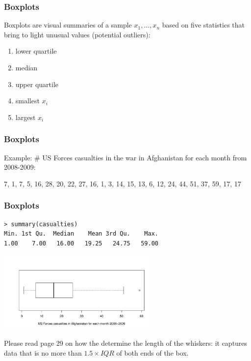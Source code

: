 \documentclass[handout]{beamer}
\newcommand{\blue}[1]{\textcolor{blue2}{#1}}
\begin{document}
\begin{frame}
\frametitle{Boxplots}
\blue{Boxplots} are visual summaries of a sample $x_1,\ldots,x_n$ based on five statistics that bring to light unusual values (potential outliers):
\begin{enumerate}
\item lower quartile
\item median
\item upper quartile
\item smallest $x_i$
\item largest $x_i$
\end{enumerate}
\end{frame}





\begin{frame}
\frametitle{Boxplots}
Example: \# US Forces casualties in the war in Afghanistan for each month from 2008-2009:  

\vspace{0.5cm}

7, 1, 7, 5, 16, 28, 20, 22, 27, 16, 1, 3, 14, 15, 13, 6, 12, 24, 44, 51, 37, 59, 17, 17


\end{frame}




\begin{frame}[fragile]
\frametitle{Boxplots}
\begin{verbatim}
> summary(casualties)  
Min. 1st Qu.  Median    Mean 3rd Qu.    Max. 
1.00    7.00   16.00   19.25   24.75   59.00 
\end{verbatim}
\begin{center}
\includegraphics[height=4cm]{figure/afghanistan.pdf}
\end{center}
\pause Please read page 29 on how the determine the length of the \blue{whiskers}: it captures data that is no more than $1.5 \times IQR$ of both ends of the box.  

\end{frame}
\end{document}
